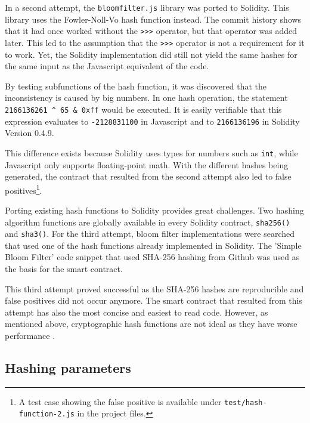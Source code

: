 In a second attempt, the \texttt{bloomfilter.js} \cite{bloomfilterjs} library was ported to Solidity. This library uses the Fowler-Noll-Vo hash function instead. The commit history shows that it had once worked without the \texttt{\textgreater{}\textgreater{}\textgreater} operator, but that operator was added later. This led to the assumption that the \texttt{\textgreater{}\textgreater{}\textgreater} operator is not a requirement for it to work. Yet, the Solidity implementation did still not yield the same hashes for the same input as the Javascript equivalent of the code.

By testing subfunctions of the hash function, it was discovered that the inconsistency is caused by big numbers. In one hash operation, the statement \texttt{2166136261 \textasciicircum{} 65 \& 0xff} would be executed. It is easily verifiable that this expression evaluates to \texttt{-2128831100} in Javascript and to \texttt{2166136196} in Solidity Version 0.4.9.

This difference exists because Solidity uses types for numbers such as \texttt{int}, while Javascript only supports floating-point math. With the different hashes being generated, the contract that resulted from the second attempt also led to false positives\footnote{A test case showing the false positive is available under \texttt{test/hash-function-2.js} in the project files.}.

Porting existing hash functions to Solidity provides great challenges. Two hashing algorithm functions are globally available in every Solidity contract, \texttt{sha256()} and \texttt{sha3()}. For the third attempt, bloom filter implementations were searched that used one of the hash functions already implemented in Solidity. The 'Simple Bloom Filter' \cite{SimpleBloomFilter} code snippet that used SHA-256 hashing from Github was used as the basis for the smart contract.

This third attempt proved successful as the SHA-256 hashes are reproducible and false positives did not occur anymore. The smart contract that resulted from this attempt has also the most concise and easiest to read code. However, as mentioned above, cryptographic hash functions are not ideal as they have worse performance \cite{BloomfilterHashingPerformance}. 

\subsection{Hashing parameters}

